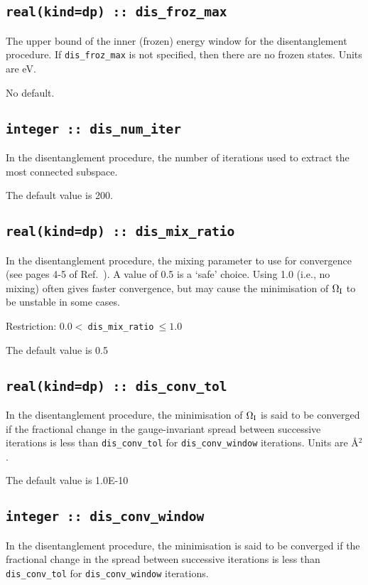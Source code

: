 \subsection[dis\_froz\_max]{\tt real(kind=dp) :: dis\_froz\_max}
The upper bound of the inner (frozen) energy window for the
disentanglement procedure. If \verb#dis_froz_max# is not specified,
then there are no frozen states. Units are eV.

No default.

\subsection[dis\_num\_iter]{\tt integer :: dis\_num\_iter}
In the disentanglement procedure, the
number of iterations used to extract the most connected subspace.

The default value is 200.

\subsection[dis\_mix\_ratio]{\tt real(kind=dp) :: dis\_mix\_ratio}
In the disentanglement procedure, the mixing parameter to use for
convergence (see pages 4-5 of Ref.~\cite{souza-prb01}). A value of 0.5
is a `safe' choice. Using 1.0 (i.e., no mixing) often gives faster
convergence, but may cause the minimisation of $\Omega_{\mathrm{I}}$ to be unstable
in some cases.

Restriction: $0.0<\:${\tt dis\_mix\_ratio}$\:\leq 1.0$

The default value is 0.5

\subsection[dis\_conv\_tol]{\tt real(kind=dp) :: dis\_conv\_tol}

In the disentanglement procedure, the minimisation of $\Omega_{\mathrm{I}}$ is said
to be converged if the fractional change in the gauge-invariant spread
between successive iterations is less than
\verb#dis_conv_tol# for \verb#dis_conv_window# iterations. Units are \AA$^2$.

The default value is 1.0E-10


\subsection[dis\_conv\_window]{\tt integer :: dis\_conv\_window}

In the disentanglement procedure, the minimisation is said to be converged
if the fractional change in the spread between successive
iterations is less than
\verb#dis_conv_tol# for \verb#dis_conv_window# iterations.

